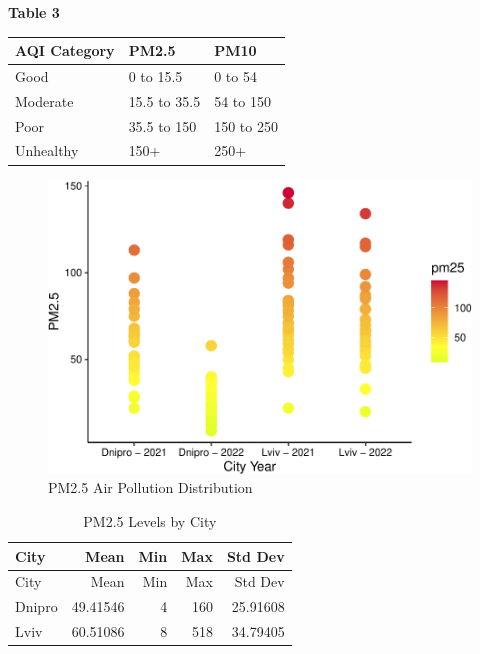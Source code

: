 \documentclass[
  12pt,
]{article}
\begin{document}
\textbf{Table 3}

\begin{longtable}[]{@{}lll@{}}
\toprule
AQI Category & PM2.5 & PM10 \\
\midrule
\endhead
Good & 0 to 15.5 & 0 to 54 \\
Moderate & 15.5 to 35.5 & 54 to 150 \\
Poor & 35.5 to 150 & 150 to 250 \\
Unhealthy & 150+ & 250+ \\
\bottomrule
\end{longtable}

\newpage

\begin{figure}
\centering
\includegraphics{Fontanie_Gordon_Weinberg_Project_files/figure-latex/plot of pm25 air pollution by cityyear-1.pdf}
\caption{PM2.5 Air Pollution Distribution}
\end{figure}

\hfill\break

\begin{longtable}[]{@{}lrrrr@{}}
\caption{PM2.5 Levels by City}\tabularnewline
\toprule
City & Mean & Min & Max & Std Dev \\
\midrule
\endfirsthead
\toprule
City & Mean & Min & Max & Std Dev \\
\midrule
\endhead
Dnipro & 49.41546 & 4 & 160 & 25.91608 \\
Lviv & 60.51086 & 8 & 518 & 34.79405 \\
\bottomrule
\end{longtable}
\end{document}
